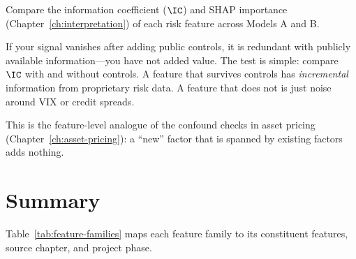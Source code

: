 Compare the information coefficient ($\IC$) and SHAP importance
(Chapter~\ref{ch:interpretation}) of each risk feature across
Models A and B.

\begin{keyidea}
If your signal vanishes after adding public controls, it is redundant
with publicly available information---you have not added value.  The
test is simple: compare $\IC$ with and without controls.  A feature
that survives controls has \emph{incremental} information from
proprietary risk data.  A feature that does not is just noise around
VIX or credit spreads.

This is the feature-level analogue of the confound checks in
asset pricing (Chapter~\ref{ch:asset-pricing}): a ``new'' factor that
is spanned by existing factors adds nothing.
\end{keyidea}


\section{Summary}
\label{sec:features-summary}

Table~\ref{tab:feature-families} maps each feature family to its
constituent features, source chapter, and project phase.

